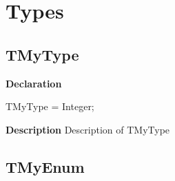 \documentclass{report}
\newif\ifpdf
\begin{document}
\section{Types}
\ifpdf
\subsection*{\large{\textbf{TMyType}}\normalsize\hspace{1ex}\hrulefill}
\else
\subsection*{TMyType}
\fi
\label{ok_back_comment-TMyType}
\begin{list}{}{
\setlength{\itemindent}{0cm}
\setlength{\listparindent}{0cm}
\setlength{\leftmargin}{\evensidemargin}
\addtolength{\leftmargin}{\tmplength}
\settowidth{\labelsep}{X}
\addtolength{\leftmargin}{\labelsep}
\setlength{\labelwidth}{\tmplength}
}
\item[\textbf{Declaration}\hfill]
\ifpdf
\begin{flushleft}
\fi
\begin{ttfamily}
TMyType = Integer;\end{ttfamily}

\ifpdf
\end{flushleft}
\fi

\par
\item[\textbf{Description}]
Description of TMyType

\end{list}
\ifpdf
\subsection*{\large{\textbf{TMyEnum}}\normalsize\hspace{1ex}\hrulefill}
\else
\end{document}
